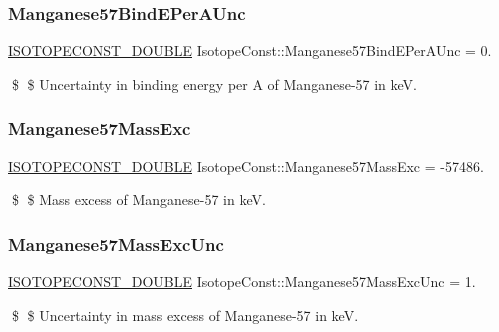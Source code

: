 \subsubsection{\texorpdfstring{Manganese57\+Bind\+E\+Per\+A\+Unc}{Manganese57BindEPerAUnc}}
{\footnotesize\ttfamily \mbox{\hyperlink{group___isotope_const-_macros_ga8f45a7272ce02c0b4c65c44636ed719a}{I\+S\+O\+T\+O\+P\+E\+C\+O\+N\+S\+T\+\_\+\+D\+O\+U\+B\+LE}} Isotope\+Const\+::\+Manganese57\+Bind\+E\+Per\+A\+Unc = 0.}

\$ \$ Uncertainty in binding energy per A of Manganese-\/57 in keV. \mbox{\label{group___isotope_const-_manganese-_mn57_ga9beaf1be14737e9d3e47f911e9daf162}} 
\subsubsection{\texorpdfstring{Manganese57\+Mass\+Exc}{Manganese57MassExc}}
{\footnotesize\ttfamily \mbox{\hyperlink{group___isotope_const-_macros_ga8f45a7272ce02c0b4c65c44636ed719a}{I\+S\+O\+T\+O\+P\+E\+C\+O\+N\+S\+T\+\_\+\+D\+O\+U\+B\+LE}} Isotope\+Const\+::\+Manganese57\+Mass\+Exc = -\/57486.}

\$ \$ Mass excess of Manganese-\/57 in keV. \mbox{\label{group___isotope_const-_manganese-_mn57_gaefec7c10a291804b7e082ca3660f467b}} 
\subsubsection{\texorpdfstring{Manganese57\+Mass\+Exc\+Unc}{Manganese57MassExcUnc}}
{\footnotesize\ttfamily \mbox{\hyperlink{group___isotope_const-_macros_ga8f45a7272ce02c0b4c65c44636ed719a}{I\+S\+O\+T\+O\+P\+E\+C\+O\+N\+S\+T\+\_\+\+D\+O\+U\+B\+LE}} Isotope\+Const\+::\+Manganese57\+Mass\+Exc\+Unc = 1.}

\$ \$ Uncertainty in mass excess of Manganese-\/57 in keV. \mbox{\label{group___isotope_const-_manganese-_mn57_ga98f664ca2c97a4ee19776784ffabd7a8}} 
